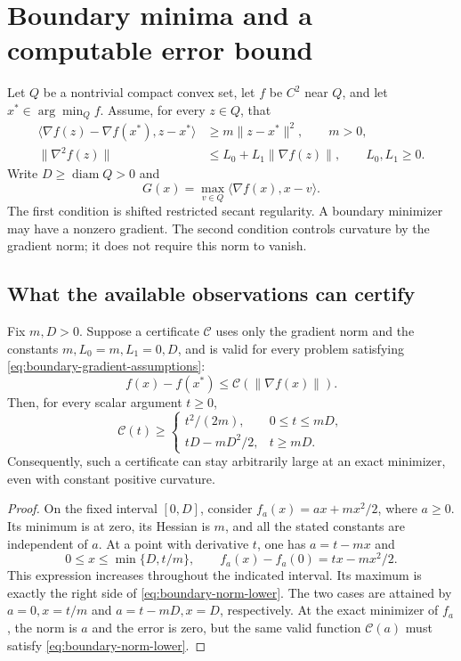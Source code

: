 \section{Boundary minima and a computable error bound}
\label{sec:boundary-gradient-model}

Let $Q$ be a nontrivial compact convex set, let $f$ be $C^2$ near $Q$,
and let $x^*\in\arg\min_Q f$. Assume, for every $z\in Q$, that
\begin{equation}\label{eq:boundary-gradient-assumptions}
\begin{aligned}
 \langle\nabla f(z)-\nabla f(x^*),z-x^*\rangle
    &\ge m\|z-x^*\|^2,\qquad m>0,\\
 \|\nabla^2 f(z)\|&\le L_0+L_1\|\nabla f(z)\|,
       \qquad L_0,L_1\ge0.
\end{aligned}
\end{equation}
Write $D\ge\operatorname{diam}Q>0$ and
\[
 G(x)=\max_{v\in Q}\langle\nabla f(x),x-v\rangle.
\]
The first condition is shifted restricted secant regularity. A boundary
minimizer may have a nonzero gradient. The second condition controls
curvature by the gradient norm; it does not require this norm to vanish.

\subsection{What the available observations can certify}

\begin{proposition}
\label{prop:boundary-norm-obstruction}
Fix $m,D>0$. Suppose a certificate $\mathcal C$ uses only the gradient
norm and the constants $m,L_0=m,L_1=0,D$, and is valid for every problem
satisfying \eqref{eq:boundary-gradient-assumptions}:
\[
 f(x)-f(x^*)\le\mathcal C(\|\nabla f(x)\|).
\]
Then, for every scalar argument $t\ge0$,
\begin{equation}\label{eq:boundary-norm-lower}
 \mathcal C(t)\ge
 \begin{cases}
 t^2/(2m),&0\le t\le mD,\\
 tD-mD^2/2,&t\ge mD.
 \end{cases}
\end{equation}
Consequently, such a certificate can stay arbitrarily large at an exact
minimizer, even with constant positive curvature.
\end{proposition}
\begin{proof}
On the fixed interval $[0,D]$, consider
$f_a(x)=ax+mx^2/2$, where $a\ge0$. Its minimum is at zero, its Hessian
is $m$, and all the stated constants are independent of $a$.
At a point with derivative $t$, one has $a=t-mx$ and
\[
 0\le x\le\min\{D,t/m\},\qquad
 f_a(x)-f_a(0)=tx-mx^2/2.
\]
This expression increases throughout the indicated interval. Its
maximum is exactly the right side of \eqref{eq:boundary-norm-lower}.
The two cases are attained by $a=0,x=t/m$ and $a=t-mD,x=D$,
respectively. At the exact minimizer of $f_a$, the norm is $a$ and the
error is zero, but the same valid function $\mathcal C(a)$ must satisfy
\eqref{eq:boundary-norm-lower}.
\end{proof}

